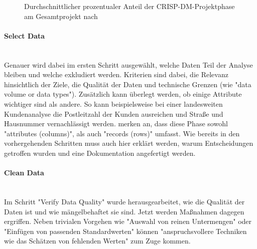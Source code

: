 \begin{figure}[H]
\centering
{}
\caption{Durchschnittlicher prozentualer Anteil der CRISP-DM-Projektphase am Gesamtprojekt nach \citep[S.~15; eigene Darstellung]{shearer_crisp-dm_2000}}
\label{fig:CRISP_DM_percent}
\end{figure}

\paragraph{Select Data}\mbox{} \\
Genauer wird dabei im ersten Schritt ausgewählt, welche Daten Teil der Analyse bleiben und welche exkludiert werden. Kriterien sind dabei, die Relevanz hinsichtlich der Ziele, die Qualität der Daten und technische Grenzen\citep[S.~16]{shearer_crisp-dm_2000} (wie "data volume or data types"\citep[S.~21]{chapman_crisp-dm_2000}). Zusätzlich kann überlegt werden, ob einige Attribute wichtiger sind als andere. So kann beispielsweise bei einer landesweiten Kundenanalyse die Postleitzahl der Kunden ausreichen und Straße und Hausnummer vernachlässigt werden.\citep[S.~16]{shearer_crisp-dm_2000} \citep[S.21]{chapman_crisp-dm_2000} merken an, dass diese Phase sowohl "attributes (columns)", als auch "records (rows)" umfasst. Wie bereits in den vorhergehenden Schritten muss auch hier erklärt werden, warum Entscheidungen getroffen wurden und eine Dokumentation angefertigt werden.\citep[S.~16]{shearer_crisp-dm_2000}

\paragraph{Clean Data}\mbox{} \\
Im Schritt "Verify Data Quality" wurde herausgearbeitet, wie die Qualität der Daten ist  und wie mängelbehaftet sie sind. Jetzt werden Maßnahmen dagegen ergriffen. Neben trivialen Vorgehen wie "Auswahl von reinen Untermengen" oder "Einfügen von passenden Standardwerten" können "anspruchsvollere Techniken wie das Schätzen von fehlenden Werten"\citep[S.21; eigene Übersetzung]{chapman_crisp-dm_2000} zum Zuge kommen.

